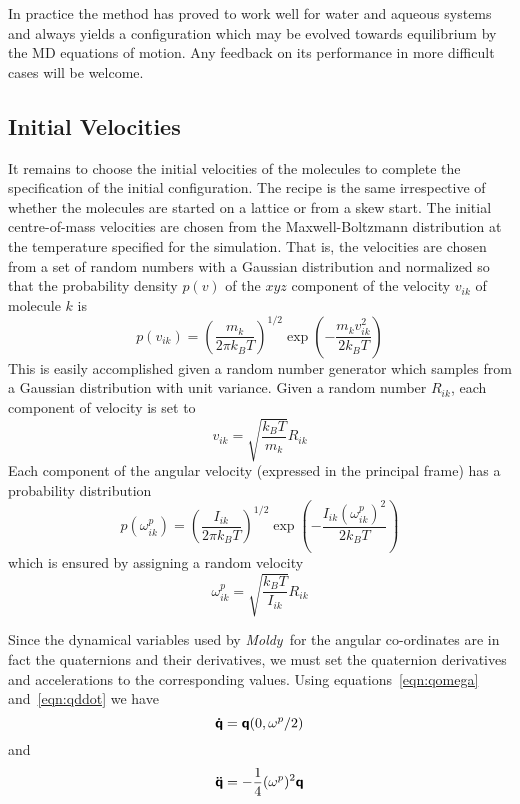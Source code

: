 \documentclass[a4paper,twoside]{report}
\newcommand{\bm}[1]{\mathbf{#1}}
\newcommand{\Quat}[1]{\mbox{\mathversion{bold}$\mathsf{#1}$}}
\newcommand{\moldy}{\emph{Moldy}}
\begin{document}
In practice the method has proved to work well for water and aqueous
systems and always yields a configuration which may be evolved towards
equilibrium by the MD equations of motion.  Any feedback on its
performance in more difficult cases will be welcome.

\subsection{Initial Velocities}
\label{sec:velinit}
It remains to choose the initial velocities of the molecules to
complete the specification of the initial configuration.  The recipe
is the same irrespective of whether the molecules are started on a
lattice or from a skew start.  The initial centre-of-mass velocities
are chosen from the Maxwell-Boltzmann distribution at the temperature
specified for the simulation\cite[pp 170]{allen:87}.  That is, the
velocities are chosen from a set of random numbers with a Gaussian
distribution and normalized so that the probability density $p(v)$ of
the $xyz$ component of the velocity $v_{ik}$ of molecule $k$ is
\begin{equation}
p(v_{ik}) = \left ( \frac{m_k}{2 \pi k_B T}\right )^{1/2} 
\exp(-\frac{m_k v_{ik}^2}{2 k_B T})
\end{equation}
This is easily accomplished given a random number generator which
samples from a Gaussian distribution with unit variance.  Given a
random number $R_{ik}$, each component of velocity is set to
\begin{equation}
v_{ik} = \sqrt{\frac{k_B T}{m_k}} R_{ik}
\end{equation}
Each component of the angular velocity (expressed in the
principal frame) has a probability distribution
\begin{equation}
p(\omega^p_{ik}) = \left ( \frac{I_{ik}}{2 \pi k_B T}\right )^{1/2}
\exp(-\frac{I_{ik} (\omega^p_{ik})^2}{2 k_B T})
\end{equation}
which is ensured by assigning a random velocity
\begin{equation}
\label{eqn:omega-rand}
\omega^p_{ik} = \sqrt{\frac{k_B T}{I_{ik}}} R_{ik}
\end{equation}

Since the dynamical variables used by \moldy\ for the angular
co-ordinates are in fact the quaternions and their derivatives, we
must set the quaternion derivatives and accelerations to the corresponding
values. Using equations~\ref{eqn:qomega} and~\ref{eqn:qddot} we
have
\begin{equation}
\Quat{\dot{q}} = \Quat{q}(0,\bm\omega^p/2)
\end{equation}
and
\begin{equation}
\Quat{\ddot{q}} = -\frac{1}{4}(\omega^p)^2 \Quat{q}
\end{equation}
\end{document}
